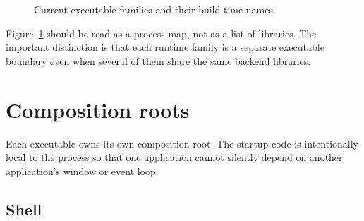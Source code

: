 \begin{figure}[htbp]
\centering
\caption{Current executable families and their build-time names.}
\label{fig:application-architecture-family-map}
\end{figure}

Figure~\ref{fig:application-architecture-family-map} should be read as a
process map, not as a list of libraries. The important distinction is that
each runtime family is a separate executable boundary even when several of them
share the same backend libraries.

\section{Composition roots}
\label{sec:application-architecture-composition-roots}

Each executable owns its own composition root. The startup code is intentionally
local to the process so that one application cannot silently depend on another
application's window or event loop.

\subsection{Shell}
\label{subsec:application-architecture-shell}

